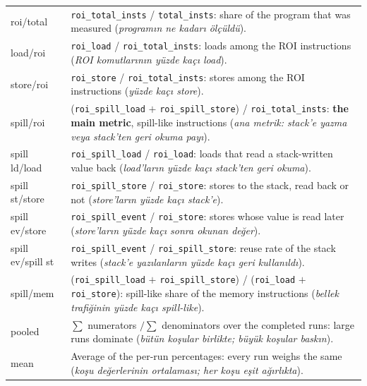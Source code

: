 \documentclass[10pt,a4paper]{article}
\newcommand{\ct}[1]{\texttt{#1}}
\renewcommand{\arraystretch}{1.2}
\begin{document}
{\footnotesize\renewcommand{\arraystretch}{1.0}
\begin{tabularx}{\textwidth}{@{}>{\raggedright\arraybackslash}p{27mm} >{\raggedright\arraybackslash}X@{}}
roi/total & \ct{roi\_total\_insts} / \ct{total\_insts}: share of the program that was measured (\textit{program{\i}n ne kadar{\i} \"ol\c{c}\"uld\"u}). \\
load/roi & \ct{roi\_load} / \ct{roi\_total\_insts}: loads among the ROI instructions (\textit{ROI komutlar{\i}n{\i}n y\"uzde ka\c{c}{\i} load}). \\
store/roi & \ct{roi\_store} / \ct{roi\_total\_insts}: stores among the ROI instructions (\textit{y\"uzde ka\c{c}{\i} store}). \\
spill/roi & (\ct{roi\_spill\_load} $+$ \ct{roi\_spill\_store}) / \ct{roi\_total\_insts}: \textbf{the main metric}, spill-like instructions (\textit{ana metrik: stack'e yazma veya stack'ten geri okuma pay{\i}}). \\
spill ld/load & \ct{roi\_spill\_load} / \ct{roi\_load}: loads that read a stack-written value back (\textit{load'lar{\i}n y\"uzde ka\c{c}{\i} stack'ten geri okuma}). \\
spill st/store & \ct{roi\_spill\_store} / \ct{roi\_store}: stores to the stack, read back or not (\textit{store'lar{\i}n y\"uzde ka\c{c}{\i} stack'e}). \\
spill ev/store & \ct{roi\_spill\_event} / \ct{roi\_store}: stores whose value is read later (\textit{store'lar{\i}n y\"uzde ka\c{c}{\i} sonra okunan de\u{g}er}). \\
spill ev/spill st & \ct{roi\_spill\_event} / \ct{roi\_spill\_store}: reuse rate of the stack writes (\textit{stack'e yaz{\i}lanlar{\i}n y\"uzde ka\c{c}{\i} geri kullan{\i}ld{\i}}). \\
spill/mem & (\ct{roi\_spill\_load} $+$ \ct{roi\_spill\_store}) / (\ct{roi\_load} $+$ \ct{roi\_store}): spill-like share of the memory instructions (\textit{bellek trafi\u{g}inin y\"uzde ka\c{c}{\i} spill-like}). \\
pooled & $\sum$ numerators $/ \sum$ denominators over the completed runs: large runs dominate (\textit{b\"ut\"un ko\c{s}ular birlikte; b\"uy\"uk ko\c{s}ular bask{\i}n}). \\
mean & Average of the per-run percentages: every run weighs the same (\textit{ko\c{s}u de\u{g}erlerinin ortalamas{\i}; her ko\c{s}u e\c{s}it a\u{g}{\i}rl{\i}kta}). \\
\end{tabularx}\par}
\end{document}
